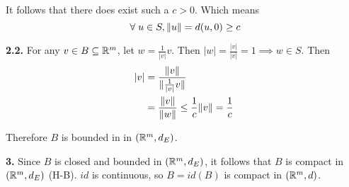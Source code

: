 \documentclass[a4paper, 12pt]{article}
\begin{document}
\begin{solution}
    It follows that there does exist such a $c > 0$. Which means \[
        \forall u \in S, \norm{u} = d(u, 0) \geq c
    \]

    \textbf{2.2.} For any $v \in B \subseteq \mathbb{R}^m$, let $w = \frac{1}{|v|}v$. Then $|w| = \frac{|v|}{|v|} = 1 \implies w \in S$. Then
    \begin{align*}
        |v| & = \frac{\lVert v\rVert}{\lVert\frac{1}{|v|}v\rVert}                            \\
            & = \frac{\lVert v\rVert}{\lVert w\rVert} \leq \frac{1}{c} \lVert v\rVert = \frac{1}{c}
    \end{align*}

    Therefore $B$ is bounded in in $(\mathbb{R}^m, d_E)$.

    \textbf{3.} Since $B$ is closed and bounded in  $(\mathbb{R}^m, d_E)$, it follows that $B$ is compact in $(\mathbb{R}^m, d_E)$ (H-B). $id$ is continuous, so $B = id(B)$ is compact in $(\mathbb{R}^m, d)$.
\end{solution}
\end{document}
